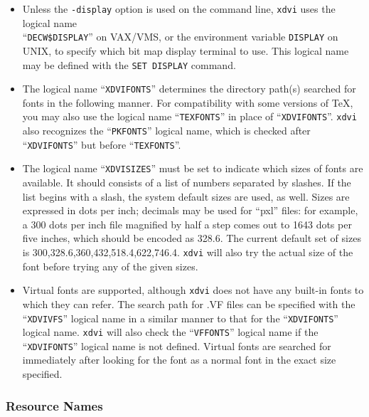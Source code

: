 \begin{itemize}



\item Unless the {\tt-display} option is used on the command line, \verb+xdvi+
uses the logical name \\ ``{\tt DECW\$DISPLAY}'' on VAX/VMS, or the environment
variable \verb+DISPLAY+ on UNIX, to specify which bit map display terminal to
use.  This logical name may be defined with the {\tt SET DISPLAY} command.

\item The logical name ``\verb+XDVIFONTS+'' determines the directory path(s)
searched for fonts in the following manner.  For compatibility with some
versions of \TeX, you may also use the logical name ``\verb+TEXFONTS+'' in
place of ``\verb+XDVIFONTS+''. \verb+xdvi+ also recognizes the
``\verb+PKFONTS+'' logical name, which is checked after ``\verb+XDVIFONTS+''
but before ``\verb+TEXFONTS+''.


\item The logical name ``\verb+XDVISIZES+'' must be set to indicate which
sizes of fonts are available.  It should consists of a list of numbers
separated by slashes.  If the list begins with a slash, the system
default sizes are used, as well.  Sizes are expressed in dots per
inch; decimals may be used for ``pxl'' files: for example, a 300 dots
per inch file magnified by half a step comes out to 1643 dots per five
inches, which should be encoded as 328.6.  The current default set of
sizes is 300,328.6,360,432,518.4,622,746.4.  \verb+xdvi+ will also try the actual
size of the font before trying any of the given sizes.


\item Virtual fonts are supported, although \verb+xdvi+ does not have any built-in
fonts to which they can refer.  The search path for .VF files can be specified
with the ``\verb+XDVIVFS+'' logical name in a similar manner to that for the
``\verb+XDVIFONTS+'' logical name.  \verb+xdvi+ will also check the ``\verb+VFFONTS+'' logical name
if the ``\verb+XDVIFONTS+'' logical name is not defined.  Virtual fonts are searched
for immediately after looking for the font as a normal font in the exact size
specified.

\end{itemize}

\subsubsection{Resource Names}

